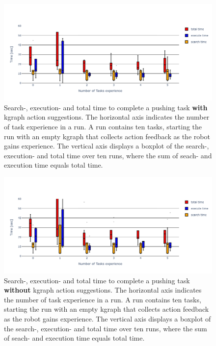 \begin{figure}[H]
    \centering
    \includegraphics[width=\textwidth]{figures/results/random_push_time_kgraph}
    \caption{Search-, execution- and total time to complete a pushing task \textbf{with} \ac{kgraph} action suggestions. The horizontal axis indicates the number of task experience in a run. A run contains ten tasks, starting the run with an empty \ac{kgraph} that collects action feedback as the robot gains experience. The vertical axis displays a boxplot of the search-, execution- and total time over ten runs, where the sum of seach- and execution time equals total time.}%
    \label{fig:random_push_time_kgraph}
\end{figure}

\begin{figure}[H]
    \centering
    \includegraphics[width=\textwidth]{figures/results/random_push_time_no_kgraph}
    \caption{Search-, execution- and total time to complete a pushing task \textbf{without} \ac{kgraph} action suggestions. The horizontal axis indicates the number of task experience in a run. A run contains ten tasks, starting the run with an empty \ac{kgraph} that collects action feedback as the robot gains experience. The vertical axis displays a boxplot of the search-, execution- and total time over ten runs, where the sum of seach- and execution time equals total time.}%
    \label{fig:random_push_time_no_kgraph}
\end{figure}

